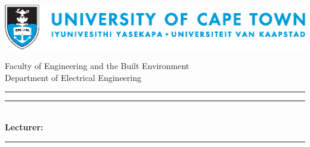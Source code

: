 \begin{center}
\begin{minipage}{1\textwidth}
\begin{center}
	
\begin{center}
\includegraphics[width=1\linewidth]{"UCThoriz"}
\end{center}
\vskip20pt
\LARGE{Faculty of Engineering and the Built Environment}\\
Department of Electrical Engineering\\
\coursecode
\vskip80pt
\hrule
\vskip20pt
\Huge\thetitle
\vskip20pt
\hrule
\vskip20pt
\Large\theauthor\\

\vskip10pt
\textbf{Lecturer:} \staffmember
\vskip20pt
\hrule
\vskip20pt
\thedate\\
\end{center}
\end{minipage}
\end{center}

\newpage 